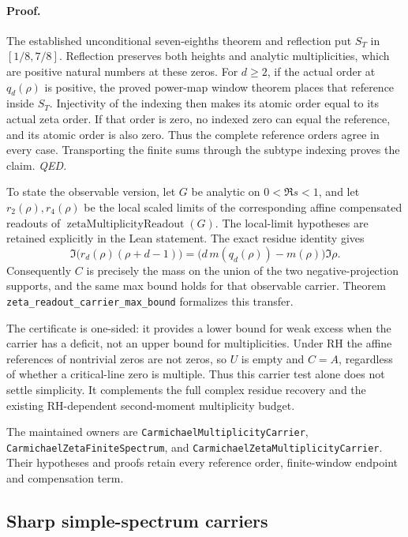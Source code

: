 \paragraph{Proof.}
The established unconditional seven-eighths theorem and reflection put
\(S_T\) in \([1/8,7/8]\). Reflection preserves both heights and analytic
multiplicities, which are positive natural numbers at these zeros.
For \(d\ge2\), if the actual order at \(q_d(\rho)\) is positive,
the proved power-map window theorem places that reference inside \(S_T\).
Injectivity of the indexing then makes its atomic order equal to its
actual zeta order. If that order is zero, no indexed zero can equal the
reference, and its atomic order is also zero.
Thus the complete reference orders agree in every case.
Transporting the finite sums through the subtype indexing proves the claim.
\hfill\textit{QED.}

To state the observable version, let \(G\) be analytic on
\(0<\Re s<1\), and let \(r_2(\rho),r_4(\rho)\) be the local scaled limits
of the corresponding affine compensated readouts of
\(\operatorname{zetaMultiplicityReadout}(G)\).
The local-limit hypotheses are retained explicitly in the Lean statement.
The exact residue identity gives
\[
 \Im\bigl(r_d(\rho)(\rho+d-1)\bigr)
   =\bigl(d\,m(q_d(\rho))-m(\rho)\bigr)\Im\rho.
\]
Consequently \(C\) is precisely the mass on the union of the two
negative-projection supports, and the same max bound holds for that
observable carrier. Theorem
\texttt{zeta\_readout\_carrier\_max\_bound} formalizes this transfer.

The certificate is one-sided: it provides a lower bound for weak excess
when the carrier has a deficit, not an upper bound for multiplicities.
Under RH the affine references of nontrivial zeros are not zeros, so
\(U\) is empty and \(C=A\), regardless of whether a critical-line zero
is multiple. Thus this carrier test alone does not settle simplicity.
It complements the full complex residue recovery and the existing
RH-dependent second-moment multiplicity budget.

The maintained owners are \texttt{CarmichaelMultiplicityCarrier},
\texttt{CarmichaelZetaFiniteSpectrum}, and
\texttt{CarmichaelZetaMultiplicityCarrier}. Their hypotheses and proofs
retain every reference order, finite-window endpoint and compensation term.

\subsection{Sharp simple-spectrum carriers}
\label{sec:simple-carrier-sharpness}

